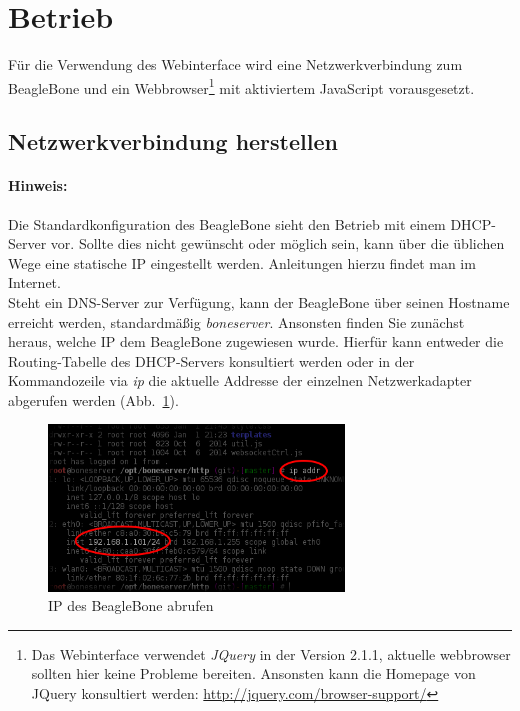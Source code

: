 \section{Betrieb}
Für die Verwendung des Webinterface wird eine Netzwerkverbindung zum BeagleBone und ein Webbrowser\footnote{Das Webinterface verwendet \emph{JQuery} in der Version 2.1.1, aktuelle webbrowser sollten hier keine Probleme bereiten. Ansonsten kann die Homepage von JQuery konsultiert werden: \url{http://jquery.com/browser-support/}} mit aktiviertem JavaScript vorausgesetzt.


\subsection{Netzwerkverbindung herstellen}

\paragraph{Hinweis:} Die Standardkonfiguration des BeagleBone sieht den Betrieb mit einem DHCP-Server vor. Sollte dies nicht gewünscht oder möglich sein, kann über die üblichen Wege eine statische IP eingestellt werden. Anleitungen hierzu findet man im Internet.\\

Steht ein DNS-Server zur Verfügung, kann der BeagleBone über seinen Hostname erreicht werden, standardmäßig \textit{boneserver}. Ansonsten finden Sie zunächst heraus, welche IP dem BeagleBone zugewiesen wurde. Hierfür kann entweder die Routing-Tabelle des DHCP-Servers konsultiert werden oder in der Kommandozeile via \emph{ip} die aktuelle Addresse der einzelnen Netzwerkadapter abgerufen werden \mbox{(Abb. \ref{fig:getBeagleBoneIP})}.

\begin{figure}[ht]
	\centering
	\includegraphics[width=0.7\textwidth]{manual/images/getBeagleBoneIP.png}
	\caption{IP des BeagleBone abrufen}
	\label{fig:getBeagleBoneIP}
\end{figure}


